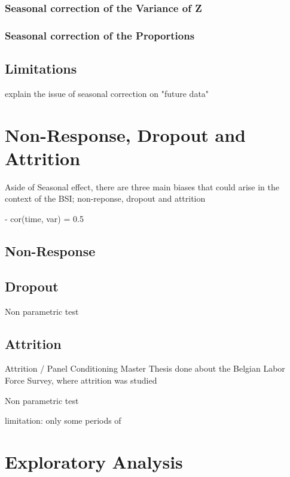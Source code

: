 \documentclass[12pt,a4paper,oneside]{book}
\begin{document}
\subsection{Seasonal correction of the Variance of Z}

\subsection{Seasonal correction of the Proportions}

\section{Limitations}

explain the issue of seasonal correction on "future data" 



\chapter{Non-Response, Dropout and Attrition}

Aside of Seasonal effect, there are three main biases that could arise in the context of the BSI; non-reponse, dropout and attrition

- cor(time, var) = 0.5


\section{Non-Response}



\section{Dropout}

Non parametric test \cite{das_nonparametric_2011}

\section{Attrition}
Attrition / Panel Conditioning 
Master Thesis done about the Belgian Labor Force Survey, where  attrition was studied \cite{priyana_hardjawidjaksana_investigating_2019}

Non parametric test \cite{das_nonparametric_2011}


limitation: only some periods of 


\chapter{Exploratory Analysis}
\end{document}

